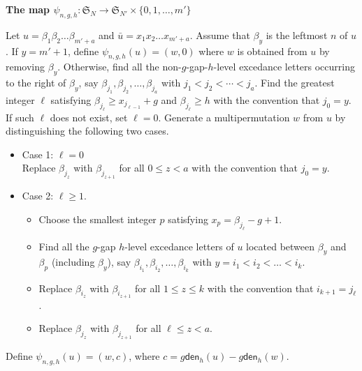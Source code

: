 \documentclass[12pt]{article}
\numberwithin{equation}{section}
\theoremstyle{plain}
\def\den{\mathsf{den}}
\begin{document}
  \begin{framed}
 	\begin{center}
 		{\bf The map $\psi_{n,g,h}:\mathfrak{S}_{N} \longrightarrow \mathfrak{S}_{N'}\times \{0,1,\ldots, m'\} $}
 	\end{center}
 	Let    $u=\beta_1\beta_2\ldots \beta_{m'+a}$ and $\bar{u}=x_1x_2\ldots x_{m'+a}$.  
 	 Assume that $\beta_y$ is the leftmost $n$ of $u$.  If $y=m'+1$, define $\psi_{n,g,h}(u)=(w,0)$ where $w$ is obtained from $u$ by removing $\beta_{y}$.  Otherwise,  
 	 find all the non-$g$-gap-$h$-level excedance letters  occurring to the right of $\beta_y$, say $\beta_{j_1}, \beta_{j_2}, \ldots, \beta_{j_a}$ with $j_1<j_2<\cdots<j_a$.  Find the greatest integer $\ell$  satisfying  $\beta_{j_\ell}\geq x_{j_{\ell-1}}+g$ and $\beta_{j_{\ell}}\geq h$ with the convention that $j_0=y$. If such $\ell$ does not exist, set $\ell=0$.  
 	 Generate a multipermutation $w$   from $u$ by distinguishing the following two cases. 
 	 \begin{itemize}
 		 
 		 \item Case 1: $\ell=0$\\
 		 Replace $\beta_{j_z}$ with $\beta_{j_{z+1}}$ for all $0\leq z<a$ with the convention that $j_0=y$. 
 		 
 		 \item Case 2: $\ell\geq 1$. 
 		  \begin{itemize}
 		 	\item    Choose the smallest  integer $p$ satisfying $x_p=\beta_{j_\ell}-g+1$.
 		 	\item Find all the $g$-gap $h$-level excedance letters  of $u$  located     between   $\beta_y$ and $\beta_{p}$ (including $\beta_y$),  say  $\beta_{i_1}, \beta_{i_2}, \ldots, \beta_{i_k}$ with    
 		 	 $ y=i_1<i_2<\ldots <i_k$.    
 		  
 		 	\item  Replace   $\beta_{i_{z}}$  with $\beta_{i_{z+1}}$  for all $1\leq z\leq k$ with the convention that $i_{k+1}=j_\ell$.
 		 	
 		 	\item   Replace  $\beta_{j_{z}}$ with $\beta_{j_{z+1}}$ for all $\ell\leq z<a $. 
 		 \end{itemize}
 		 
 		 
 	 
 	
 	\end{itemize}
 	Define $\psi_{n,g,h}(u)=(w,c)$, where  $c=g\den_{h}(u)-g\den_{h}(w)$. 
 	
 \end{framed}
\end{document}
